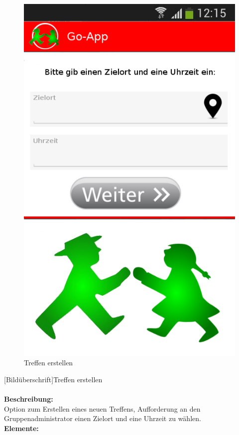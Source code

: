 \begin{figure} [H]
	\caption{Treffen erstellen}
\begin{center}
	\includegraphics[scale =0.5]{resources/images/treffpunkt_erstellen.png}
\end{center}
\end{figure}
[Bildüberschrift]Treffen erstellen \\ \\
\textbf{Beschreibung:}\\
Option zum Erstellen eines neuen Treffens, Aufforderung an den Gruppenadministrator einen Zielort und eine Uhrzeit zu wählen.\\
\textbf{Elemente:}\\
